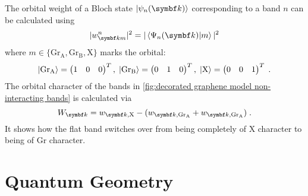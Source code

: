 \documentclass[../main.tex]{subfiles}
\begin{document}
The orbital weight of a Bloch state \(\ket{\psi_n (\vb{k})}\) corresponding to a band \(n\) can be calculated using
\begin{equation}
	\vert w_{\vb{k} m}^n \vert^2 = \vert \braket{\Psi_n (\vb{k}) \vert m} \vert^2
\end{equation}
where \(m \in \{\mathrm{Gr}_{\mathrm{A}}, \mathrm{Gr}_{\mathrm{B}}, \mathrm{X}\}\) marks the orbital:
\begin{equation}
	\ket{\mathrm{Gr}_{\mathrm{A}}} = \begin{pmatrix} 1 & 0 & 0 \end{pmatrix}^T,\;
	\ket{\mathrm{Gr}_{\mathrm{B}}} = \begin{pmatrix} 0 & 1 & 0 \end{pmatrix}^T,\;
	\ket{\mathrm{X}} = \begin{pmatrix} 0 & 0 & 1 \end{pmatrix}^T \;.
\end{equation} 
The orbital character of the bands in \cref{fig:decorated graphene model non-interacting bands} is calculated via
\begin{equation}
	W_{\vb{k}} = w_{\vb{k}, \mathrm{X}} - (w_{\vb{k}, \mathrm{Gr}_{\mathrm{A}}} + w_{\vb{k}, \mathrm{Gr}_{\mathrm{A}}})\;.
\end{equation}
It shows how the flat band switches over from being completely of \(\mathrm{X}\) character to being of \(\mathrm{Gr}\) character.


\section{Quantum Geometry}\label{sec:decorated graphene quantum metric}
\end{document}
